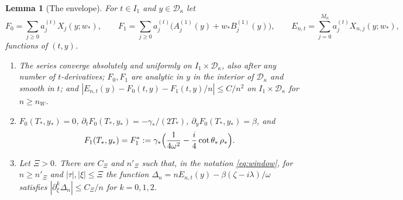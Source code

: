 \documentclass[11pt]{amsart}
\newtheorem{lemma}[theorem]{Lemma}
\theoremstyle{definition}
\theoremstyle{remark}
\numberwithin{equation}{section}
\begin{document}
\begin{lemma}[The envelope]\label{lem:envelope}
For $t\in I_1$ and $y\in\mathcal D_\kappa$ let
\[
F_0=\sum_{j\ge0}a^{(t)}_jX_j(y;w_*),\qquad F_1=\sum_{j\ge0}a^{(t)}_j\bigl(A^{(1)}_j(y)+w_*B^{(1)}_j(y)\bigr),\qquad
E_{n,t}=\sum_{j=0}^{M_n}a^{(t)}_jX_{n,j}(y;w_*),
\]
functions of $(t,y)$.
\begin{enumerate}
\item[(a)] The series converge absolutely and uniformly on $I_1\times\mathcal D_\kappa$, also after any number of
$t$-derivatives; $F_0,F_1$ are analytic in $y$ in the interior of $\mathcal D_\kappa$ and smooth in $t$; and
$|E_{n,t}(y)-F_0(t,y)-F_1(t,y)/n|\le C/n^2$ on $I_1\times\mathcal D_\kappa$ for $n\ge n_W$.
\item[(b)] $F_0(T_*,y_*)=0$, $\partial_tF_0(T_*,y_*)=-\gamma_*/(2T_*)$, $\partial_yF_0(T_*,y_*)=\beta$, and
\[
F_1(T_*,y_*)=F_1^*:=\gamma_*\Bigl(\frac1{4\omega^2}-\frac i4\cot\theta_*\,\rho_*\Bigr).
\]
\item[(c)] Let $\Xi>0$. There are $C_\Xi$ and $n'_\Xi$ such that, in the notation \eqref{eq:window}, for $n\ge n'_\Xi$ and
$|\tau|,|\xi|\le \Xi$ the function $\Delta_n=nE_{n,t}(y)-\beta(\zeta-i\lambda)/\omega$ satisfies
$|\partial_\xi^k\Delta_n|\le C_\Xi/n$ for $k=0,1,2$.
\end{enumerate}
\end{lemma}
\end{document}
